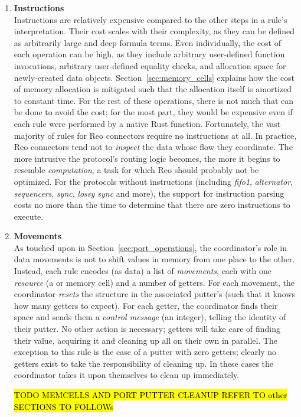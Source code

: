\begin{enumerate}
	
	\item \textbf{Instructions}\\
	Instructions are relatively expensive compared to the other steps in a rule's interpretation. Their cost scales with their complexity, as they can be defined as arbitrarily large and deep formula terms. Even individually, the cost of each operation can be high, as they include arbitrary user-defined function invocations, arbitrary user-defined equality checks, and allocation space for newly-created data objects. Section~\ref{sec:memory_cells} explains how the cost of memory allocation is mitigated such that the allocation itself is amortized to constant time. For the rest of these operations, there is not much that can be done to avoid the cost; for the most part, they would be expensive even if each rule were performed by a native Rust function. Fortunately, the vast majority of rules for Reo connectors require no instructions at all. In practice, Reo connectors tend not to \textit{inspect} the data whose flow they coordinate. The more intrusive the protocol's routing logic becomes, the more it begins to resemble \textit{computation}, a task for which Reo should probably not be optimized. For the protocols without instructions (including \textit{fifo1}, \textit{alternator}, \textit{sequencers}, \textit{sync}, \textit{lossy sync} and more), the support for instruction parsing costs no more than the time to determine that there are zero instructions to execute.
	 
	 \item \textbf{Movements}\\
	 As touched upon in Section~\ref{sec:port_operations}, the coordinator's role in data movements is not to shift values in memory from one place to the other. Instead, each rule encodes (as data) a list of \textit{movements}, each with one \textit{resource} (a  or memory cell) and a number of getters. For each movement, the coordinator \textit{resets} the  structure in the associated putter's  (such that it knows how many getters to expect). For each getter, the coordinator finds their space and sends them a \textit{control message} (an integer), telling the identity of their putter. No other action is necessary; getters will take care of finding their value, acquiring it and cleaning up all on their own in parallel. The exception to this rule is the case of a putter with zero getters; clearly no getters exist to take the responsibility of cleaning up. In these cases the coordinator takes it upon themselves to clean up immediately. 
	 
	 \hl{TODO MEMCELLS AND PORT PUTTER CLEANUP REFER TO other SECTIONS TO FOLLOWs}
	
\end{enumerate}

